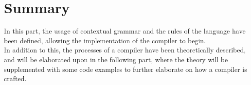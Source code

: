 
\section{Summary}
In this part, the usage of contextual grammar and the rules of the language have been defined, allowing the implementation of the compiler to begin.\\
In addition to this, the processes of a compiler have been theoretically described, and will be elaborated upon in the following part, where the theory will be supplemented with some code examples to further elaborate on how a compiler is crafted.

